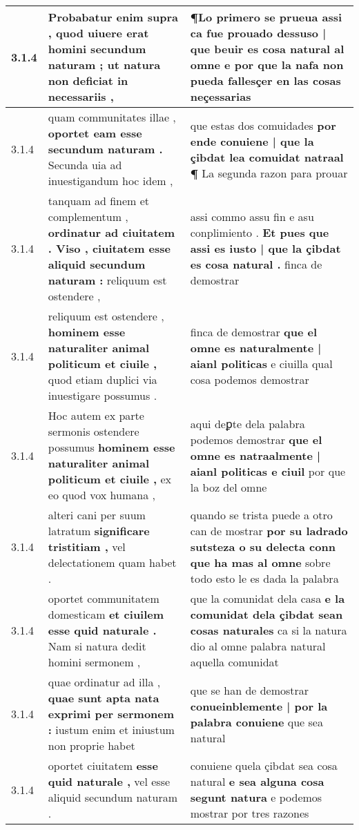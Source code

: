 \begin{tabular}{|p{1cm}|p{6.5cm}|p{6.5cm}|}
3.1.4 & Probabatur enim supra , \textbf{ quod uiuere erat homini secundum naturam ; } ut natura non deficiat in necessariis , & ¶Lo primero se prueua \textbf{ assi ca fue prouado dessuso | que beuir es cosa natural al omne } e por que la nafa non pueda fallesçer en las cosas neçessarias \\\hline
3.1.4 & quam communitates illae , \textbf{ oportet eam esse secundum naturam . } Secunda uia ad inuestigandum hoc idem , & que estas dos comuidades \textbf{ por ende conuiene | que la çibdat lea comuidat natraal ¶ } La segunda razon para prouar \\\hline
3.1.4 & tanquam ad finem et complementum , \textbf{ ordinatur ad ciuitatem . Viso , ciuitatem esse aliquid secundum naturam : } reliquum est ostendere , & assi commo assu fin e asu conplimiento . \textbf{ Et pues que assi es iusto | que la çibdat es cosa natural . } finca de demostrar \\\hline
3.1.4 & reliquum est ostendere , \textbf{ hominem esse naturaliter animal politicum et ciuile , } quod etiam duplici via inuestigare possumus . & finca de demostrar \textbf{ que el omne es naturalmente | aianl politicas } e ciuilla qual cosa podemos demostrar \\\hline
3.1.4 & Hoc autem ex parte sermonis ostendere possumus \textbf{ hominem esse naturaliter animal politicum et ciuile , } ex eo quod vox humana , & aqui deꝑte dela palabra podemos demostrar \textbf{ que el omne es natraalmente | aianl politicas e ciuil } por que la boz del omne \\\hline
3.1.4 & alteri cani per suum latratum \textbf{ significare tristitiam , } vel delectationem quam habet . & quando se trista puede a otro can de mostrar \textbf{ por su ladrado sutsteza o su delecta conn que ha mas al omne } sobre todo esto le es dada la palabra \\\hline
3.1.4 & oportet communitatem domesticam \textbf{ et ciuilem esse quid naturale . } Nam si natura dedit homini sermonem , & que la comunidat dela casa \textbf{ e la comunidat dela çibdat sean cosas naturales } ca si la natura dio al omne palabra natural aquella comunidat \\\hline
3.1.4 & quae ordinatur ad illa , \textbf{ quae sunt apta nata exprimi per sermonem : } iustum enim et iniustum non proprie habet & que se han de demostrar \textbf{ conueinblemente | por la palabra conuiene } que sea natural \\\hline
3.1.4 & oportet ciuitatem \textbf{ esse quid naturale , } vel esse aliquid secundum naturam . & conuiene quela çibdat sea cosa natural \textbf{ e sea alguna cosa segunt natura } e podemos mostrar por tres razones \\\hline

\end{tabular}
